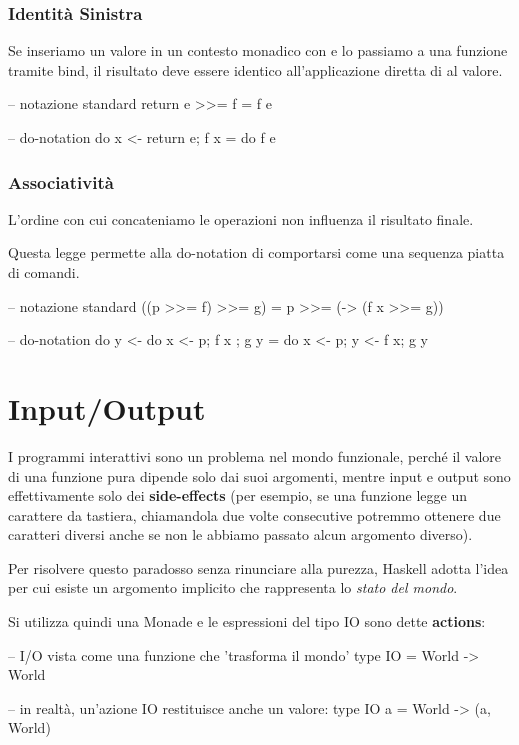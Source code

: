 \subsubsection*{Identità Sinistra}
Se inseriamo un valore in un contesto monadico con  e lo passiamo a una funzione  tramite bind, il risultato deve essere identico all'applicazione diretta di  al valore.
\begin{haskellbox}{}
-- notazione standard
return e >>= f = f e

-- do-notation
do { x <- return e; f x } = do { f e }
\end{haskellbox}

\subsubsection*{Associatività}
L'ordine con cui concateniamo le operazioni non influenza il risultato finale. 

Questa legge permette alla do-notation di comportarsi come una sequenza piatta di comandi.
\begin{haskellbox}{}
-- notazione standard
((p >>= f) >>= g) = p >>= (\x -> (f x >>= g))

-- do-notation
do { y <- do { x <- p; f x }; g y } = do { x <- p; y <- f x; g y }
\end{haskellbox}

\section{Input/Output}
I programmi interattivi sono un problema nel mondo funzionale, perché il valore di una funzione pura dipende solo dai suoi argomenti, mentre input e output sono effettivamente solo dei \textbf{side-effects} (per esempio, se una funzione legge un carattere da tastiera, chiamandola due volte consecutive potremmo ottenere due caratteri diversi anche se non le abbiamo passato alcun argomento diverso).

Per risolvere questo paradosso senza rinunciare alla purezza, Haskell adotta l'idea per cui esiste un argomento implicito che rappresenta lo \textit{stato del mondo}.

Si utilizza quindi una Monade e le espressioni del tipo IO sono dette \textbf{actions}:
\begin{haskellbox}{}
-- I/O vista come una funzione che 'trasforma il mondo'
type IO = World -> World
    
-- in realtà, un'azione IO restituisce anche un valore:
type IO a = World -> (a, World)
\end{haskellbox}

